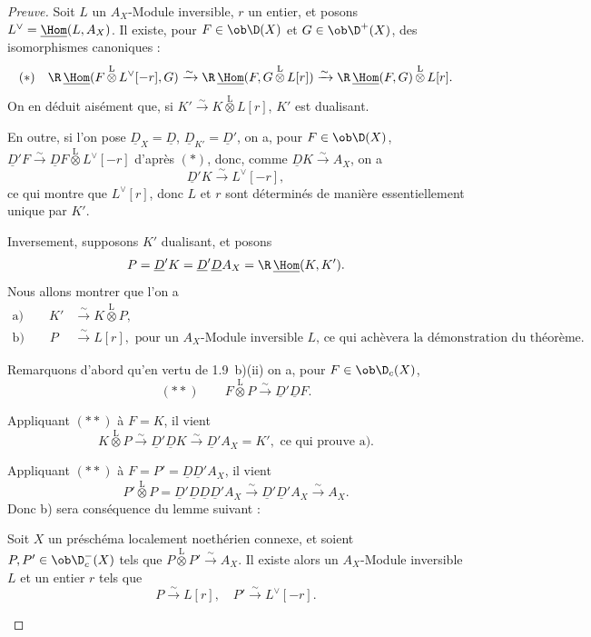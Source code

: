 \begin{proof}[Preuve]
Soit $L$ un $A_X$-Module inversible, $r$ un entier, et posons $L^{\vee} = \underline{\Hom}(L, A_X)$. Il existe, pour $F \in \ob \D(X)$ et $G \in \ob \D^{+}(X)$, des isomorphismes canoniques :
\[
(*) \quad \R\,\underline{\Hom}(F \mathop{\otimes}\limits^{\mathrm{L}} L^{\vee}[-r], G) \xrightarrow{\sim} \R\,\underline{\Hom}(F, G \mathop{\otimes}\limits^{\mathrm{L}} L[r]) \xrightarrow{\sim} \R\,\underline{\Hom}(F,G) \mathop{\otimes}\limits^{\mathrm{L}} L[r].
\]
On en déduit aisément que, si $K' \xrightarrow{\sim} K \mathop{\otimes}\limits^{\mathrm{L}} L[r]$, $K'$ est dualisant.

En outre, si l'on pose $\underline{D}_X = \underline{D}$, $\underline{D}_{K'} = \underline{D}'$, on a, pour $F \in \ob \D(X)$, $\underline{D}'F \xrightarrow{\sim} \underline{D} F \mathop{\otimes}\limits^{\mathrm{L}} L^{\vee}[-r]$ d'après $(*)$, donc, comme $\underline{D} K \xrightarrow{\sim} A_X$, on a
\[
\underline{D}' K \xrightarrow{\sim} L^{\vee}[-r],
\]
ce qui montre que $L^{\vee}[r]$, donc $L$ et $r$ sont déterminés de manière essentiellement unique par $K'$.

Inversement, supposons $K'$ dualisant, et posons
\[
P = \underline{D}'K = \underline{D}'\underline{D} A_X = \R\,\underline{\Hom}(K,K').
\]
Nous allons montrer que l'on a
\begin{align*}
\text{a)} \qquad K' &\xrightarrow{\sim} K \mathop{\otimes}\limits^{\mathrm{L}} P, \\
\text{b)} \qquad P &\xrightarrow{\sim} L[r], \text{ pour un $A_X$-Module inversible $L$, ce qui achèvera la démonstration du théorème.}
\end{align*}

Remarquons d'abord qu'en vertu de 1.9~b)(ii) on a, pour $F \in \ob \D_c(X)$,
\[
(**) \qquad F \mathop{\otimes}\limits^{\mathrm{L}} P \xrightarrow{\sim} \underline{D}'\underline{D} F.
\]

Appliquant $(**)$ à $F = K$, il vient
\[
K \mathop{\otimes}\limits^{\mathrm{L}} P \xrightarrow{\sim} \underline{D}'\underline{D} K \xrightarrow{\sim} \underline{D}' A_X = K', \text{ ce qui prouve a).}
\]

Appliquant $(**)$ à $F = P' = \underline{D}\underline{D}'A_X$, il vient
\[
P' \mathop{\otimes}\limits^{\mathrm{L}} P = \underline{D}'\underline{D}\underline{D}\underline{D}'A_X \xrightarrow{\sim} \underline{D}'\underline{D}'A_X \xrightarrow{\sim} A_X.
\]
Donc b) sera conséquence du lemme suivant :

\begin{lemma}[cf.~{\upshape [H]~V~3.3}]
Soit $X$ un préschéma localement noethérien connexe, et soient $P, P' \in \ob \D_c^{-}(X)$ tels que $P \mathop{\otimes}\limits^{\mathrm{L}} P' \xrightarrow{\sim} A_X$. Il existe alors un $A_X$-Module inversible $L$ et un entier $r$ tels que
\[
P \xrightarrow{\sim} L[r], \quad P' \xrightarrow{\sim} L^{\vee}[-r].
\]
\end{lemma}


\end{proof}
